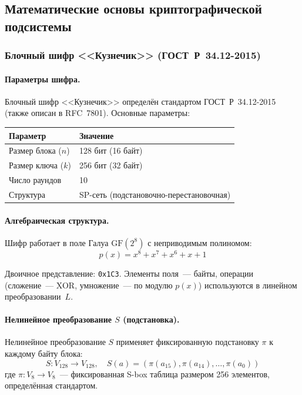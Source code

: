 \documentclass[a4paper,14pt]{extarticle}
\begin{document}
\subsection{Математические основы криптографической подсистемы}

\subsubsection{Блочный шифр <<Кузнечик>> (ГОСТ~Р~34.12-2015)}

\paragraph{Параметры шифра.}

Блочный шифр <<Кузнечик>> определён стандартом ГОСТ~Р~34.12-2015 (также описан в RFC~7801). Основные параметры:

\begin{table}[h]
\centering
\begin{tabular}{@{}ll@{}}
\toprule
Параметр & Значение \\
\midrule
Размер блока ($n$) & 128 бит (16 байт) \\
Размер ключа ($k$) & 256 бит (32 байт) \\
Число раундов & 10 \\
Структура & SP-сеть (подстановочно-перестановочная) \\
\bottomrule
\end{tabular}
\end{table}

\paragraph{Алгебраическая структура.}

Шифр работает в поле Галуа $\mathrm{GF}(2^8)$ с неприводимым полиномом:
\begin{equation}
    p(x) = x^8 + x^7 + x^6 + x + 1
\end{equation}

Двоичное представление: \texttt{0x1C3}. Элементы поля~--- байты, операции (сложение~--- XOR, умножение~--- по модулю $p(x)$) используются в линейном преобразовании~$L$.

\paragraph{Нелинейное преобразование $S$ (подстановка).}

Нелинейное преобразование $S$ применяет фиксированную подстановку $\pi$ к каждому байту блока:
\begin{equation}
    S: V_{128} \to V_{128}, \quad S(a) = (\pi(a_{15}), \pi(a_{14}), \ldots, \pi(a_0))
\end{equation}
где $\pi: V_8 \to V_8$~--- фиксированная S-box таблица размером 256 элементов, определённая стандартом.
\end{document}
